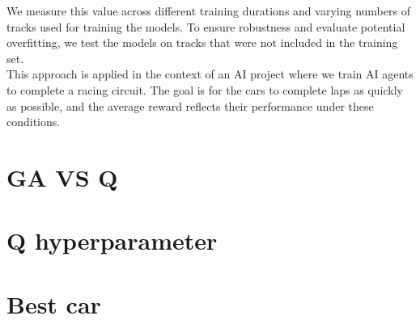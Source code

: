\documentclass[11pt,a4paper]{article}
\begin{document}
We measure this value across different training durations and varying numbers of tracks used for training the models. To ensure robustness and evaluate potential overfitting, we test the models on tracks that were not included in the training set. \\
This approach is applied in the context of an AI project where we train AI agents to complete a racing circuit. The goal is for the cars to complete laps as quickly as possible, and the average reward reflects their performance under these conditions.
		\section{GA VS Q}
		
		\section{Q hyperparameter}
		
		\section{Best car}
\end{document}
